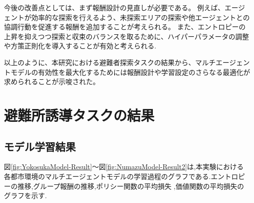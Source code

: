 今後の改善点としては、まず報酬設計の見直しが必要である。
例えば、エージェントが効率的な探索を行えるよう、未探索エリアの探索や他エージェントとの協調行動を促進する報酬を追加することが考えられる。
また、エントロピーの上昇を抑えつつ探索と収束のバランスを取るために、ハイパーパラメータの調整や方策正則化を導入することが有効と考えられる.

以上のように、本研究における避難者探索タスクの結果から、マルチエージェントモデルの有効性を最大化するためには報酬設計や学習設定のさらなる最適化が求められることが示唆された。

\section{避難所誘導タスクの結果}
\subsection{モデル学習結果}
図\ref{fig:YokosukaModel-Result}～図\ref{fig:NumazuModel-Result2}は,本実験における各都市環境のマルチエージェントモデルの学習過程のグラフである.エントロピーの推移,グループ報酬の推移,ポリシー関数の平均損失
,価値関数の平均損失のグラフを示す.
